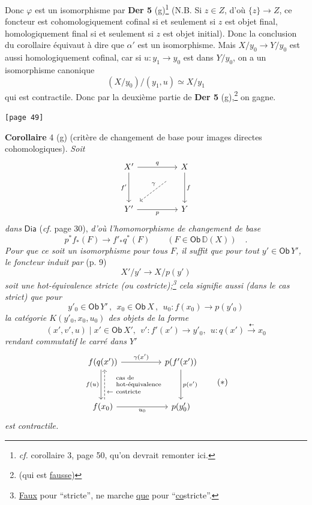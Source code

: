\documentclass[11pt]{article}
\newcommand{\printedpage}[1]{\marginpar{\footnotesize p.~#1}}
\newcommand{\msp}[1]{\marginpar{\footnotesize [#1]}}
\newcommand{\D}{\mathbb{D}}
\newcommand{\Dia}{\mathsf{Dia}}
\newcommand{\Ob}{\mathsf{Ob}}
\begin{document}
\printedpage{27}

\noindent Donc $\varphi$ est un isomorphisme par \textbf{Der 5} (g)\footnote[17]{\textit{cf.} corollaire 3, page 50, qu'on devrait remonter ici.} (N.B. Si $z \in Z$, d'où $\{z\} \to Z$, ce foncteur est cohomologiquement cofinal si et seulement si $z$ est objet final, homologiquement final si et seulement si $z$ est objet initial). Donc la conclusion du corollaire équivaut à dire que $\alpha'$ est un isomorphisme. Mais $X/y_{0} \to Y/y_{0}$ est aussi homologiquement cofinal, car si $u : y_{1} \to y_{0}$ est dans $Y/y_{0}$, on a un isomorphisme canonique
\[ (X/y_{0})/(y_{1}, u) \simeq X/y_{1} \]
qui est contractile. Donc par la deuxième partie de \textbf{Der 5} (g),\footnote[18]{(qui est \underline{fausse})} on gagne.

\noindent\msp{page 49}\texttt{[page 49]}

\noindent\textbf{Corollaire} 4 (g) (critère de changement de base pour images directes cohomologiques). \textit{Soit}
\[
\begin{tikzcd}[row sep=huge, column sep=huge]
X' \arrow[r, "q"] \arrow[d, "f'"'] & X \arrow[d, "f"] \arrow[dl, dashed, "\gamma"', shorten <=4ex, shorten >=1ex] \\
Y' \arrow[r, "p"'] & Y
\end{tikzcd}
\]
\textit{dans} $\Dia$ (\textit{cf.} page 30), \textit{d'où l'homomorphisme de changement de base}
\[ p^{*} f_{*}(F) \longrightarrow f'_{*} q^{*}(F) \qquad (F \in \Ob\,\D(X)) \quad . \]
\textit{Pour que ce soit un isomorphisme pour tous $F$, il suffit que pour tout $y' \in \Ob\,Y'$, le foncteur induit par} (p. 9)
\[ X'/y' \longrightarrow X/p(y') \]
\textit{soit une hot-équivalence stricte (ou costricte);\footnote[19]{\underline{Faux} pour “stricte”, ne marche \underline{que} pour “\underline{\underline{co}}stricte”.} cela signifie aussi (dans le cas strict) que pour}
\[ y'_{0} \in \Ob\,Y' \,,\ \ x_{0} \in \Ob\,X \,,\ \ u_{0} : f(x_{0}) \longrightarrow p(y'_{0}) \]
\textit{la catégorie $K(y'_{0}, x_{0}, u_{0})$ des objets de la forme}
\[ (x', v', u) \mid x' \in \Ob\,X',\ \ v' : f'(x') \to y'_{0},\ \ u : q(x') \overset{\dashleftarrow}{\longrightarrow} x_{0} \]
\textit{rendant commutatif le carré dans $Y'$}
\[
\begin{tikzcd}[row sep=huge, column sep=huge]
f(q(x')) \arrow[r, "\gamma(x')"] \arrow[d, shift right=0.5ex, "f(u)"'] & p(f'(x')) \arrow[d, "p(v')"] \\
f(x_{0}) \arrow[r, "u_{0}"'] \arrow[u, dashed, shift right=0.5ex, "\leftarrow\ \text{\scriptsize\shortstack[l]{cas de\\hot-équivalence\\costricte}}"'] & p(y'_{0})
\end{tikzcd}
\tag*{$(*)$}
\]
\textit{est contractile.}
\end{document}
